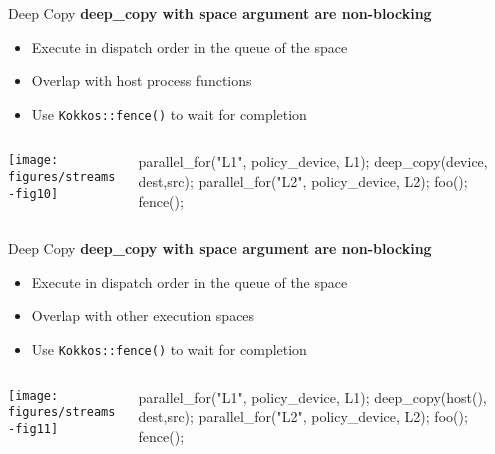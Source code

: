 
\begin{frame}[fragile]{Deep Copy}
  \textbf{deep\_copy with space argument are non-blocking}
  \begin{itemize}
    \item{Execute in dispatch order in the queue of the space}
    \item{Overlap with host process functions}
    \item{Use \texttt{Kokkos::fence()} to wait for completion}
  \end{itemize}

  \begin{columns}[]
    \begin{column}{.67\textwidth}

       \texttt{[image: figures/streams-fig10]} 
 
    \end{column}

    \begin{column}{.33\textwidth}
	    \begin{code}[linebackgroundcolor={},keywords={L1,L2,policy_device}]
parallel_for("L1", 
  policy_device, L1);
deep_copy(device,
  dest,src);
parallel_for("L2", 
  policy_device, L2);
foo();
fence();
      \end{code}
    \end{column}
  \end{columns}
\end{frame}


\begin{frame}[fragile]{Deep Copy}
  \textbf{deep\_copy with space argument are non-blocking}
  \begin{itemize}
    \item{Execute in dispatch order in the queue of the space}
    \item{Overlap with other execution spaces}
    \item{Use \texttt{Kokkos::fence()} to wait for completion}
  \end{itemize}

  \begin{columns}[]
    \begin{column}{.67\textwidth}

       \texttt{[image: figures/streams-fig11]} 
 
    \end{column}

    \begin{column}{.33\textwidth}
	    \begin{code}[linebackgroundcolor={},keywords={L1,L2,policy_device}]
parallel_for("L1", 
  policy_device, L1);
deep_copy(host(),
  dest,src);
parallel_for("L2", 
  policy_device, L2);
foo();
fence();
      \end{code}
    \end{column}
  \end{columns}
\end{frame}

